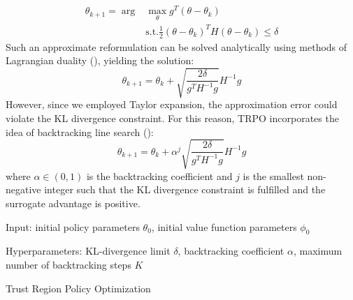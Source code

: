\begin{align*}
  \theta_{k+1} = \arg &\max_\theta g^T(\theta - \theta_k)   \\  
  &\text{s.t.}  \frac{1}{2} (\theta-\theta_k)^TH(\theta-\theta_k) \leq \delta
\end{align*}
Such an approximate reformulation can be solved analytically using methods of Lagrangian duality (\cite{LagrangDuality}), yielding the solution:
\[\theta_{k+1} = \theta_k + \sqrt{\frac{2\delta}{g^TH^{-1}g}}H^{-1}g\]
However, since we employed Taylor expansion, the approximation error could violate the KL divergence constraint.
For this reason, TRPO incorporates the idea of backtracking line search (\cite{BacktrackingLineSearch}):
\[\theta_{k+1} = \theta_k + \alpha^j \sqrt{\frac{2\delta}{g^TH^{-1}g}}H^{-1}g\]
where $\alpha \in (0,1)$ is the backtracking coefficient and $j$ is the smallest non-negative integer such that the KL divergence constraint is fulfilled and the surrogate advantage is positive.

\begin{algorithm}[H]
  Input: initial policy parameters $\theta_0$, initial value function parameters $\phi_0$

  Hyperparameters: KL-divergence limit $\delta$, backtracking coefficient $\alpha$, maximum number of backtracking steps $K$
  
  
  \caption{Trust Region Policy Optimization}
  \label{TRPO}
\end{algorithm}


